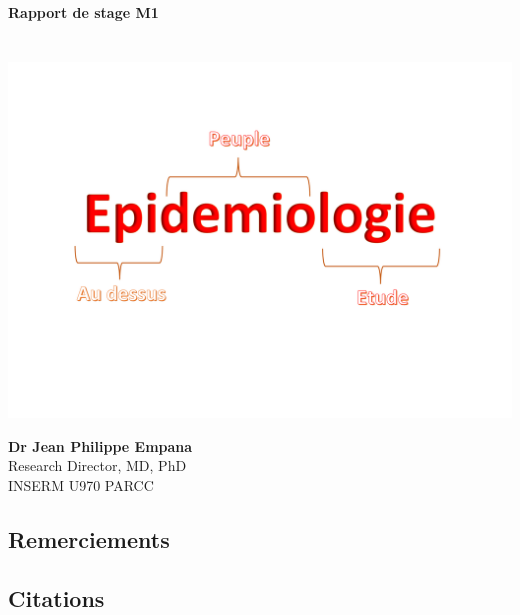 \documentclass{book}
\makeatletter
\let\mytitle\@title
\let\myauthor\@author
\let\mydate\@date
\makeatother
\begin{document}
\begin{titlepage}
\bigskip
\begin{center}
\Huge{\textbf{Rapport de stage M1}}\\
\bigskip
\mytitle \\
\bigskip
\normalsize{\textbf{\mydate}}\\
\includegraphics[scale= .15]{Epidemiologie_logo_r.png}

\end{center}
\begin{center}
\begin{flushleft}
\myauthor 
\end{flushleft}

\begin{flushright}
\textbf{Dr Jean Philippe Empana} \\
Research Director, MD, PhD \\
INSERM U970 PARCC
\end{flushright}
\end{center}

\end{titlepage}
 
\frontmatter

\tableofcontents

\newpage
\begin{center}
\section*{Remerciements}
\end{center}

\newpage
\begin{center}
\section*{Citations}
\end{center}
\newpage
\end{document}
